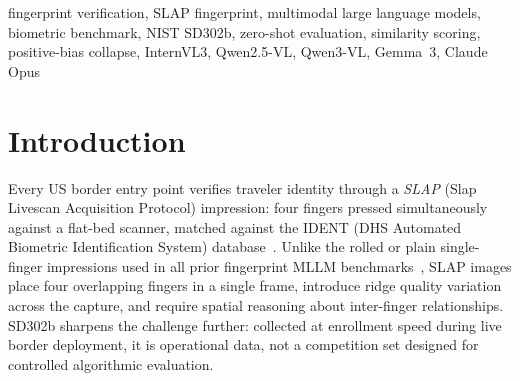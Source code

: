 \documentclass[journal]{IEEEtran}
\begin{document}
\begin{abstract}
evaluation alongside prompting. On these independent-capture pairs the perfect
SD302b separation does not replicate: every open-source model falls to chance
(embedding AUC~$0.40$--$0.51$, similarity-scoring AUC~$0.50$--$0.56$), none can
tell a subject's own two hands apart (same-person different-hand diagnostic
AUC~$0.52$--$0.58$), and the task-description collapse recurs (FAR~$98$--$100\%$).
What little residual signal exists is sensor consistency, not identity: the
strongest model's genuine-pair AUC drops from $0.64$ within a device to $0.49$
across devices. Current MLLMs thus match global appearance rather than ridge
structure on four-finger images.
%
A stratified analysis across gender, race, and age finds that demographic
disparity tracks model \emph{weakness} rather than strength, inverting the
pattern reported for face benchmarks, though small subgroup sizes make
this an initial probe rather than a definitive audit.
Together these results establish the first SLAP-specific MLLM
verification baseline and show that prompt format governs whether collapse
occurs, that near-perfect scores on a single-capture benchmark can be an
artifact of pair construction, and that on genuinely independent captures no
current MLLM verifies four-finger fingerprints.
\end{abstract}

\begin{IEEEkeywords}
fingerprint verification, SLAP fingerprint, multimodal large language
models, biometric benchmark, NIST SD302b, zero-shot evaluation,
similarity scoring, positive-bias collapse, InternVL3, Qwen2.5-VL, Qwen3-VL, Gemma~3, Claude Opus
\end{IEEEkeywords}

\section{Introduction}
\label{sec:intro}

Every US border entry point verifies traveler identity through a
\emph{SLAP} (Slap Livescan Acquisition Protocol) impression: four
fingers pressed simultaneously against a flat-bed scanner, matched
against the IDENT (DHS Automated Biometric Identification System)
database~\cite{nist_sd302}.
Unlike the rolled or plain single-finger impressions used in all prior
fingerprint MLLM benchmarks~\cite{fpbench2025}, SLAP images place four
overlapping fingers in a single frame, introduce ridge quality variation
across the capture, and require spatial reasoning about inter-finger
relationships.
SD302b sharpens the challenge further: collected at enrollment speed
during live border deployment, it is operational data, not a
competition set designed for controlled algorithmic evaluation.
\end{document}
